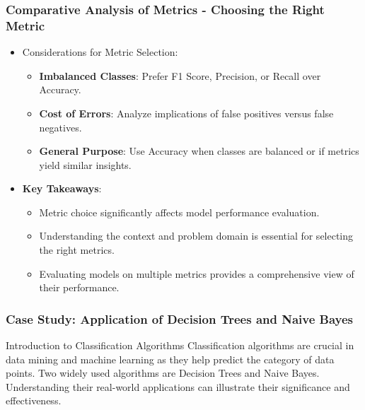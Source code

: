 \documentclass[aspectratio=169]{beamer}
\begin{document}
\begin{frame}[fragile]
    \frametitle{Comparative Analysis of Metrics - Choosing the Right Metric}
    \begin{itemize}
        \item Considerations for Metric Selection:
        \begin{itemize}
            \item \textbf{Imbalanced Classes}: Prefer F1 Score, Precision, or Recall over Accuracy.
            \item \textbf{Cost of Errors}: Analyze implications of false positives versus false negatives.
            \item \textbf{General Purpose}: Use Accuracy when classes are balanced or if metrics yield similar insights.
        \end{itemize}
        \item \textbf{Key Takeaways}:
        \begin{itemize}
            \item Metric choice significantly affects model performance evaluation.
            \item Understanding the context and problem domain is essential for selecting the right metrics.
            \item Evaluating models on multiple metrics provides a comprehensive view of their performance.
        \end{itemize}
    \end{itemize}
\end{frame}

\begin{frame}[fragile]
    \frametitle{Case Study: Application of Decision Trees and Naive Bayes}
    \begin{block}{Introduction to Classification Algorithms}
        Classification algorithms are crucial in data mining and machine learning as they help predict the category of data points. Two widely used algorithms are Decision Trees and Naive Bayes. Understanding their real-world applications can illustrate their significance and effectiveness.
    \end{block}
\end{frame}
\end{document}
